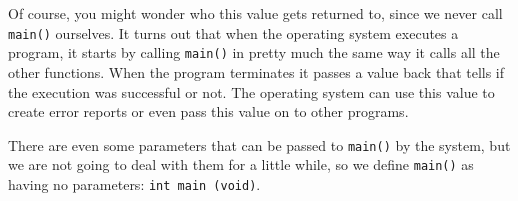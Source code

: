 Of course, you might wonder who this value gets returned to, since
we never call {\tt main()} ourselves.  It turns out that when the
operating system executes a program, it starts by calling {\tt main()}
in pretty much the same way it calls all the other functions.
When the program terminates it passes a value back 
that tells if the execution was successful or not. The operating system
can use this value to create error reports or even pass this value on 
to other programs.

There are even some parameters that can be passed to {\tt main()}
by the system, but we are not going to deal with them for a little
while, so we define  {\tt main()} as having no parameters:  {\tt int main (void)}. 








